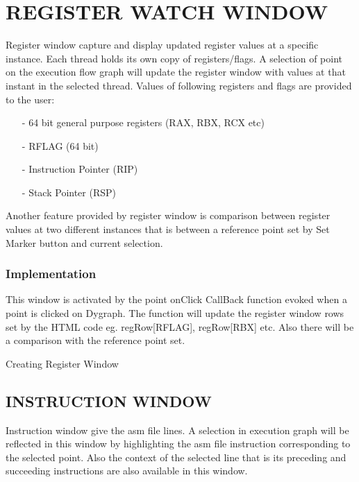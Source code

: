 \section {REGISTER WATCH WINDOW}

Register window capture and display updated register values at a specific instance. Each thread holds its own copy of registers/flags. A selection of point on the execution flow graph will update the register window with values at that instant in the selected thread. Values of following registers and flags are provided to the user:
\begin{itemize}
	\item[-] 64 bit general purpose registers (RAX, RBX, RCX etc)
	\item[-] RFLAG (64 bit)
	\item[-] Instruction Pointer (RIP)
	\item[-] Stack Pointer (RSP)
\end{itemize}

Another feature provided by register window is comparison between register values at two different instances that is between a reference point set by Set Marker button and current selection. 

\subsubsection{Implementation}

This window is activated by the point onClick CallBack function evoked when a point is clicked on Dygraph. The function will update the register window rows set by the HTML code eg. regRow[RFLAG], regRow[RBX] etc. Also there will be a comparison with the reference point set. 

\IncMargin{1em}
\begin{algorithm}[H]
\DontPrintSemicolon
{} 
\BlankLine
{}
\caption{Creating Register Window}
\end{algorithm}\DecMargin{1em}

\subsection {INSTRUCTION WINDOW}

Instruction window give the asm file lines. A selection in execution graph will be reflected in this window by highlighting the asm file instruction corresponding to the selected point. Also the context of the selected line that is its preceding and succeeding instructions are also available in this window.
